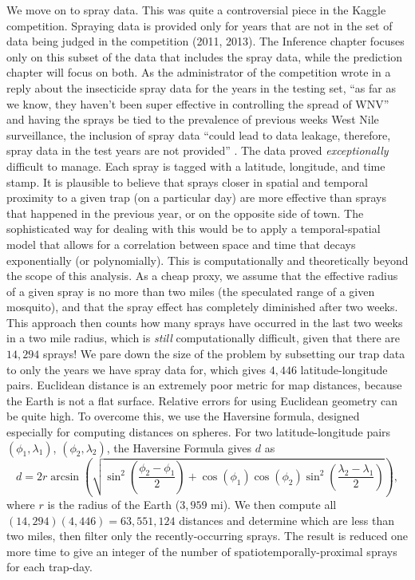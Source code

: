 \documentclass[12pt]{article}
\begin{document}
We move on to spray data. This was quite a controversial piece in the Kaggle competition. Spraying data is provided only for years that are not in the set of data being judged in the competition (2011, 2013). The Inference chapter focuses only on this subset of the data that includes the spray data, while the prediction chapter will focus on both. As the administrator of the competition wrote in a reply about the insecticide spray data for the years in the testing set, ``as far as we know, they haven't been super effective in controlling the spread of WNV'' \cite{SprayQuote1} and having the sprays be tied to the prevalence of previous weeks West Nile surveillance, the inclusion of spray data ``could lead to data leakage, therefore, spray data in the test years are not provided'' \cite{SprayQuote2}. The data proved \emph{exceptionally} difficult to manage. Each spray is tagged with a latitude, longitude, and time stamp. It is plausible to believe that sprays closer in spatial and temporal proximity to a given trap (on a particular day) are more effective than sprays that happened in the previous year, or on the opposite side of town. The sophisticated way for dealing with this would be to apply a temporal-spatial model that allows for a correlation between space and time that decays exponentially (or polynomially). This is computationally and theoretically beyond the scope of this analysis. As a cheap proxy, we assume that the effective radius of a given spray is no more than two miles (the speculated range of a given mosquito), and that the spray effect has completely diminished after two weeks. This approach then counts how many sprays have occurred in the last two weeks in a two mile radius, which is \emph{still} computationally difficult, given that there are $14,294$ sprays! We pare down the size of the problem by subsetting our trap data to only the years we have spray data for, which gives $4,446$ latitude-longitude pairs. Euclidean distance is an extremely poor metric for map distances, because the Earth is not a flat surface. Relative errors for using Euclidean geometry can be quite high. To overcome this, we use the Haversine formula, designed especially for computing distances on spheres. For two latitude-longitude pairs $(\phi_1, \lambda_1)$, $(\phi_2, \lambda_2)$, the Haversine Formula gives $d$ as
\[ d = 2 r \arcsin\left(\sqrt{\sin^2\left(\frac{\phi_2 - \phi_1}{2}\right) + \cos(\phi_1) \cos(\phi_2)\sin^2\left(\frac{\lambda_2 - \lambda_1}{2}\right)}\right), \]
where $r$ is the radius of the Earth ($3,959$ mi). We then compute all $(14,294)(4,446) = 63,551,124$ distances and determine which are less than two miles, then filter only the recently-occurring sprays. The result is reduced one more time to give an integer of the number of spatiotemporally-proximal sprays for each trap-day.
\end{document}
